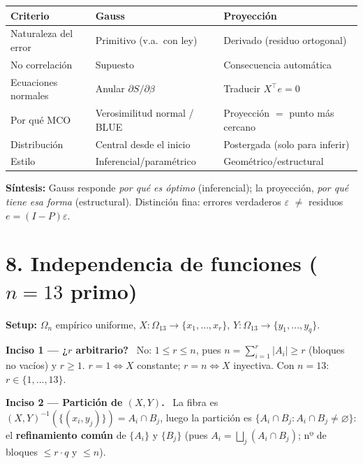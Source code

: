 \documentclass[11pt]{article}
\newcommand{\Om}{\Omega_n}
\newcommand{\inc}[1]{\smallskip\noindent\textbf{\color{blue!30!black}#1}\ }
\begin{document}
\begin{center}
\begin{tabular}{@{}p{4.0cm}p{4.4cm}p{4.4cm}@{}}
\toprule
\textbf{Criterio} & \textbf{Gauss} & \textbf{Proyección}\\
\midrule
Naturaleza del error & Primitivo (v.a.\ con ley) & Derivado (residuo ortogonal)\\
No correlación & Supuesto & Consecuencia automática\\
Ecuaciones normales & Anular $\partial S/\partial\beta$ & Traducir $X^\top e=0$\\
Por qué MCO & Verosimilitud normal / BLUE & Proyección $=$ punto más cercano\\
Distribución & Central desde el inicio & Postergada (solo para inferir)\\
Estilo & Inferencial/paramétrico & Geométrico/estructural\\
\bottomrule
\end{tabular}
\end{center}
\textbf{Síntesis:} Gauss responde \emph{por qué es óptimo} (inferencial); la proyección, \emph{por qué tiene esa
forma} (estructural). Distinción fina: errores verdaderos $\varepsilon$ $\neq$ residuos $e=(I-P)\varepsilon$.

\section*{8. Independencia de funciones ($n=13$ primo)}
\textbf{Setup:} $\Om$ empírico uniforme, $X:\Omega_{13}\to\{x_1,\dots,x_r\}$, $Y:\Omega_{13}\to\{y_1,\dots,y_q\}$.

\inc{Inciso 1 — ¿$r$ arbitrario?} No: $1\le r\le n$, pues $n=\sum_{i=1}^r|A_i|\ge r$ (bloques no vacíos) y
$r\ge1$. $r=1\iff X$ constante; $r=n\iff X$ inyectiva. Con $n=13$: $r\in\{1,\dots,13\}$.

\inc{Inciso 2 — Partición de $(X,Y)$.} La fibra es $(X,Y)^{-1}(\{(x_i,y_j)\})=A_i\cap B_j$, luego la partición
es $\{A_i\cap B_j:A_i\cap B_j\neq\varnothing\}$: el \textbf{refinamiento común} de $\{A_i\}$ y $\{B_j\}$
(pues $A_i=\bigsqcup_j(A_i\cap B_j)$; nº de bloques $\le r\cdot q$ y $\le n$).
\end{document}
